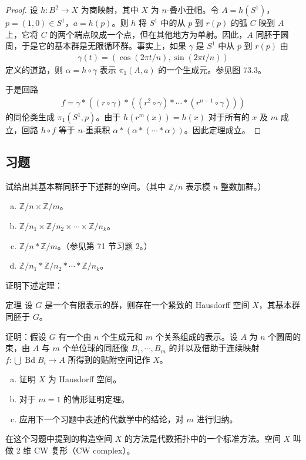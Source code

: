 \documentclass[../../main.tex]{subfiles}
\begin{document}
\begin{proof}
设 $h:B^2\to X$ 为商映射，其中 $X$ 为 $n$-叠小丑帽。令 $A=h(S^1)$，$p=(1,0)\in S^1$，$a=h(p)$。则 $h$ 将 $S^1$ 中的从 $p$ 到 $r(p)$ 的弧 $C$ 映到 $A$ 上，它将 $C$ 的两个端点映成一个点，但在其他地方为单射。因此，$A$ 同胚于圆周，于是它的基本群是无限循环群。事实上，如果 $\gamma$ 是 $S^1$ 中从 $p$ 到 $r(p)$ 由
\begin{align*}
\gamma(t)=(\cos(2\pi t/n),\sin(2\pi t/n))
\end{align*}
定义的道路，则 $\alpha=h\circ\gamma$ 表示 $\pi_1(A,a)$ 的一个生成元。参见图 73.3。


于是回路
\begin{align*}
f=\gamma*((r\circ\gamma)*((r^2\circ\gamma)*\cdots*(r^{n-1}\circ\gamma)))
\end{align*}
的同伦类生成 $\pi_1(S^1,p)$。由于 $h(r^m(x))=h(x)$ 对于所有的 $x$ 及 $m$ 成立，回路 $h\circ f$ 等于 $n$-重乘积 $\alpha*(\alpha*(\cdots*\alpha))$。因此定理成立。
\end{proof}

\subsection*{习题}

\begin{exercise}\label{exercise:ch11-73-01}
试给出其基本群同胚于下述群的空间。（其中 $\mathbb{Z}/n$ 表示模 $n$ 整数加群。）
\begin{enumerate}[(a)]
\item $\mathbb{Z}/n\times\mathbb{Z}/m$。
\item $\mathbb{Z}/n_1\times\mathbb{Z}/n_2\times\cdots\times\mathbb{Z}/n_k$。
\item $\mathbb{Z}/n*\mathbb{Z}/m$。（参见第 71 节习题 2。）
\item $\mathbb{Z}/n_1*\mathbb{Z}/n_2*\cdots*\mathbb{Z}/n_k$。
\end{enumerate}
\end{exercise}

\begin{exercise}\label{exercise:ch11-73-02}
证明下述定理：

定理 设 $G$ 是一个有限表示的群，则存在一个紧致的 Hausdorff 空间 $X$，其基本群同胚于 $G$。

证明：假设 $G$ 有一个由 $n$ 个生成元和 $m$ 个关系组成的表示。设 $A$ 为 $n$ 个圆周的束，由 $A$ 与 $m$ 个单位球的同胚像 $B_1,\cdots,B_m$ 的并以及借助于连续映射 $f:\bigcup\operatorname{Bd}B_i\to A$ 所得到的贴附空间记作 $X$。
\begin{enumerate}[(a)]
\item 证明 $X$ 为 Hausdorff 空间。
\item 对于 $m=1$ 的情形证明定理。
\item 应用下一个习题中表述的代数学中的结论，对 $m$ 进行归纳。
\end{enumerate}

在这个习题中提到的构造空间 $X$ 的方法是代数拓扑中的一个标准方法。空间 $X$ 叫做 2 维 CW 复形（CW complex）。
\end{exercise}
\end{document}
